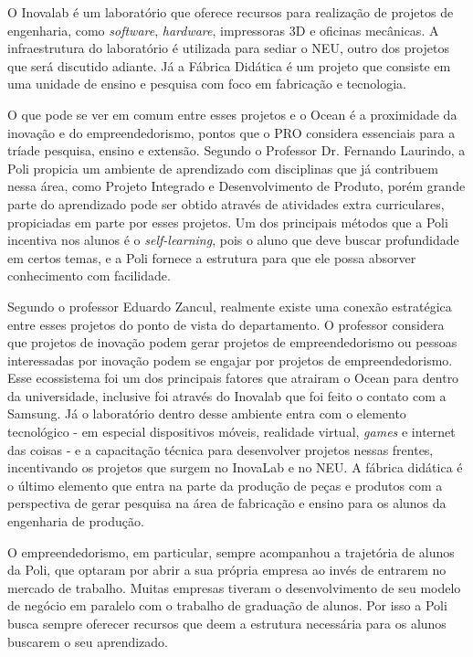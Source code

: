 O Inovalab é um laboratório que oferece recursos para realização de projetos de engenharia, como \textit{software}, \textit{hardware}, impressoras 3D e oficinas mecânicas. A infraestrutura do laboratório é utilizada para sediar o NEU, outro dos projetos que será discutido adiante. Já a Fábrica Didática é um projeto que consiste em uma unidade de ensino e pesquisa com foco em fabricação e tecnologia.

O que pode se ver em comum entre esses projetos e o Ocean é a proximidade da inovação e do empreendedorismo, pontos que o PRO considera essenciais para a tríade pesquisa, ensino e extensão. Segundo o Professor Dr. Fernando Laurindo, a Poli propicia um ambiente de aprendizado com disciplinas que já contribuem nessa área, como Projeto Integrado e Desenvolvimento de Produto, porém grande parte do aprendizado pode ser obtido através de atividades extra curriculares, propiciadas em parte por esses projetos. Um dos principais métodos que a Poli incentiva nos alunos é o \textit{self-learning}, pois o aluno que deve buscar profundidade em certos temas, e a Poli fornece a estrutura para que ele possa absorver conhecimento com facilidade.

Segundo o professor Eduardo Zancul, realmente existe uma conexão estratégica entre esses projetos do ponto de vista do departamento. O professor considera que projetos de inovação podem gerar projetos de empreendedorismo ou pessoas interessadas por inovação podem se engajar por projetos de empreendedorismo. Esse ecossistema foi um dos principais fatores que atrairam o Ocean para dentro da universidade, inclusive foi através do Inovalab que foi feito o contato com a Samsung. Já o laboratório dentro desse ambiente entra com o elemento tecnológico - em especial dispositivos móveis, realidade virtual, \textit{games} e internet das coisas - e a capacitação técnica para desenvolver projetos nessas frentes, incentivando os projetos que surgem no InovaLab e no NEU. A fábrica didática é o último elemento que entra na parte da produção de peças e produtos com a perspectiva de gerar pesquisa na área de fabricação e ensino para os alunos da engenharia de produção.

O empreendedorismo, em particular, sempre acompanhou a trajetória de alunos da Poli, que optaram por abrir a sua própria empresa ao invés de entrarem no mercado de trabalho. Muitas empresas tiveram o desenvolvimento de seu modelo de negócio em paralelo com o trabalho de graduação de alunos. Por isso a Poli busca sempre oferecer recursos que deem a estrutura necessária para os alunos buscarem o seu aprendizado.


